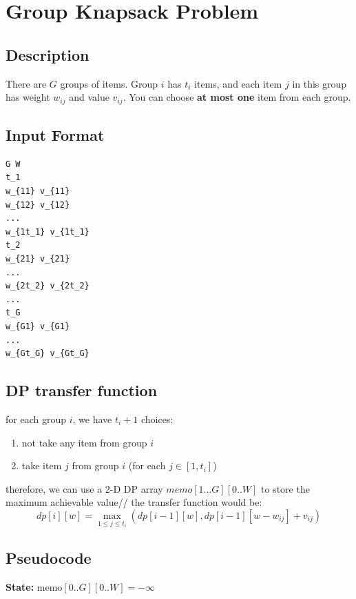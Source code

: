 \documentclass[a4paper,12pt]{article}
\begin{document}
\section{Group Knapsack Problem}
\subsection*{Description}
There are $G$ groups of items.  
Group $i$ has $t_i$ items, and each item $j$ in this group has weight $w_{ij}$ and value $v_{ij}$.  
You can choose \textbf{at most one} item from each group.
\subsection{Input Format}
\begin{verbatim}
G W
t_1
w_{11} v_{11}
w_{12} v_{12}
...
w_{1t_1} v_{1t_1}
t_2
w_{21} v_{21}
...
w_{2t_2} v_{2t_2}
...
t_G
w_{G1} v_{G1}
...
w_{Gt_G} v_{Gt_G}
\end{verbatim}
\subsection{DP transfer function}
for each group $i$, we have $t_i + 1$ choices:
\begin{enumerate}
    \item not take any item from group $i$
    \item take item $j$ from group $i$ (for each $j \in [1, t_i]$)
\end{enumerate}
therefore, we can use a 2-D DP array $memo[1...G][0..W]$ to store the maximum achievable value//
the transfer function would be:
\[
dp[i][w] = \max_{1 \leq j \leq t_i}(dp[i-1][w], dp[i-1][w - w_{ij}] + v_{ij})
\]
\subsection*{Pseudocode}
\begin{algorithm}[H]
\caption{Top-Down Group Knapsack with Memoization}

\textbf{State:} $\text{memo}[0..G][0..W] = -\infty$\;


\;
\end{algorithm}
\end{document}
